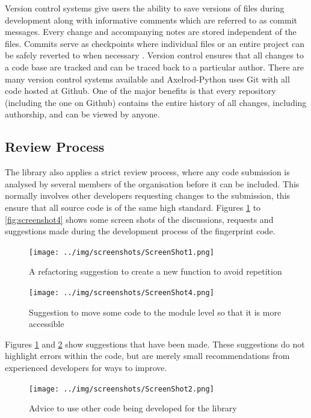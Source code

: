 Version control systems give users the ability to save versions of files during development along with informative comments which are referred to as commit messages.
Every change and accompanying notes are stored independent of the files.
Commits serve as checkpoints where individual files or an entire project can be safely reverted to when necessary \cite{Ram2013}.
Version control ensures that all changes to a code base are tracked and can be traced back to a particular author.
There are many version control systems available and Axelrod-Python uses Git \cite{Git} with all code hosted at Github.
One of the major benefits is that every repository (including the one on Github) contains the entire history of all changes, including authorship, and can be viewed by anyone.

\subsection{Review Process}
The library also applies a strict review process, where any code submission is analysed by several members of the organisation before it can be included.
This normally involves other developers requesting changes to the submission, this ensure that all source code is of the same high standard.
Figures \ref{fig:screenshot1} to \ref{fig:screenshot4} shows some screen shots of the discussions, requests and suggestions made during the development process of the fingerprint code.

\begin{figure}[htbp!]
\centering
\texttt{[image: ../img/screenshots/ScreenShot1.png]}
\caption{A refactoring suggestion to create a new function to avoid repetition}
\label{fig:screenshot1}
\end{figure}

\begin{figure}[htbp!]
\texttt{[image: ../img/screenshots/ScreenShot4.png]}
\caption{Suggestion to move some code to the module level so that it is more accessible}
\label{fig:screenshot2}
\end{figure}

Figures \ref{fig:screenshot1} and \ref{fig:screenshot2} show suggestions that have been made.
These suggestions do not highlight errors within the code, but are merely small recommendations from experienced developers for ways to improve.

\begin{figure}[htbp!]
\texttt{[image: ../img/screenshots/ScreenShot2.png]}
\caption{Advice to use other code being developed for the library}
\label{fig:screenshot3}
\end{figure}

